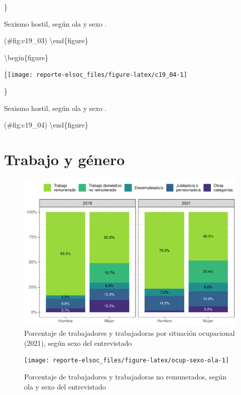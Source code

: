 \documentclass[
  12pt,
  openany]{book}
\begin{document}
\}

\caption{Sexismo hostil, según ola y sexo .}

(\#fig:c19\_03)
\textbackslash end\{figure\}

\textbackslash begin\{figure\}

\{\centering \texttt{[image: reporte-elsoc\_files/figure-latex/c19\_04-1]}

\}

\caption{Sexismo hostil, según ola y sexo .}

(\#fig:c19\_04)
\textbackslash end\{figure\}

\hypertarget{trabajo-y-guxe9nero}{%
\section{Trabajo y género}\label{trabajo-y-guxe9nero}}

\begin{figure}

{\centering \includegraphics{reporte-elsoc_files/figure-latex/ocup-sexo-1} 

}

\caption{Porcentaje de trabajadores y trabajadoras por situación ocupacional (2021), según sexo del entrevistado}\label{fig:ocup-sexo}
\end{figure}

\begin{figure}

{\centering \texttt{[image: reporte-elsoc\_files/figure-latex/ocup-sexo-ola-1]} 

}

\caption{Porcentaje de trabajadores y trabajadoras no remunerados, según ola y sexo del entrevistado}\label{fig:ocup-sexo-ola}
\end{figure}
\end{document}
